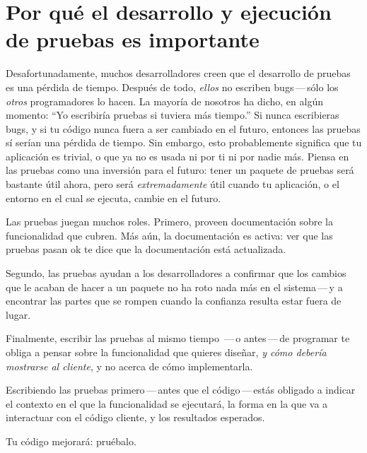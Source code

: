 \documentclass[a4paper,10pt,twoside]{book}
\begin{document}
\section{Por qu\'e el desarrollo y ejecuci\'on de pruebas es importante}

Desafortunadamente, muchos desarrolladores creen que el desarrollo de pruebas es una p\'erdida de tiempo.
Despu\'es de todo, \emph{ellos} no escriben bugs\,---\,s\'olo los \emph{otros} programadores lo hacen.
La mayor\'ia de nosotros ha dicho, en alg\'un momento:
``Yo escribir\'ia pruebas si tuviera m\'as tiempo.''
Si nunca escribieras bugs, y si tu c\'odigo nunca fuera a ser cambiado en el futuro,
entonces las pruebas s\'i ser\'ian una p\'erdida de tiempo.
Sin embargo, esto probablemente significa que tu aplicaci\'on es trivial, o que ya no es usada ni por ti ni por nadie m\'as.  
Piensa en las pruebas como una inversi\'on para el futuro: tener un paquete de pruebas ser\'a bastante \'util ahora,
 pero ser\'a \emph{extremadamente} \'util cuando tu aplicaci\'on, o el entorno en el cual se ejecuta, cambie en el futuro.

Las pruebas juegan muchos roles. Primero, proveen documentaci\'on sobre la funcionalidad que cubren.
M\'as a\'un, la documentaci\'on es activa: ver que las pruebas pasan ok te dice que la documentaci\'on est\'a actualizada.

Segundo, las pruebas ayudan a los desarrolladores a confirmar que los cambios que le 
acaban de hacer a un paquete no ha roto nada m\'as en el sistema\,---\,y a encontrar las partes que se rompen cuando la confianza resulta estar fuera de lugar.

Finalmente, escribir las pruebas al mismo tiempo \,---\,o antes\,---\,de programar te obliga a pensar sobre la funcionalidad que quieres dise\~nar, \emph{y c\'omo deber\'ia mostrarse al cliente}, 
y no acerca de c\'omo implementarla.

Escribiendo las pruebas primero\,---\,antes que el c\'odigo\,---\,est\'as obligado a indicar el contexto en el que 
la funcionalidad se ejecutar\'a, la forma en la que va a interactuar con el c\'odigo cliente, y los resultados esperados.  

Tu c\'odigo mejorar\'a: pru\'ebalo.

\end{document}
